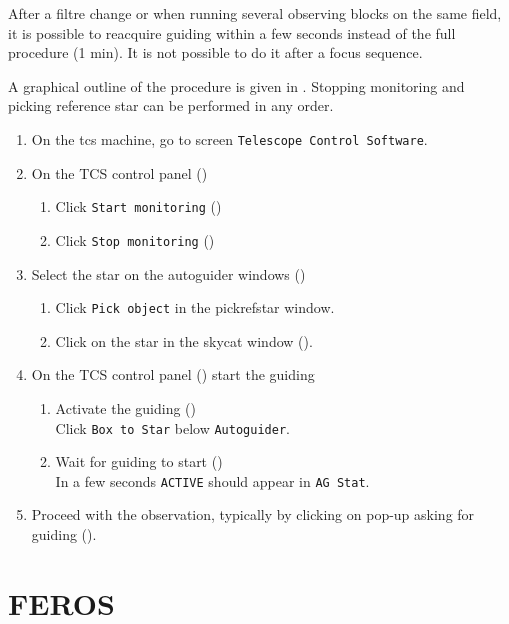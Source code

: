 \documentclass[11pt,fleqn,a4paper]{book}
\begin{document}
After a filtre change or when running several observing blocks on the same
field, it is possible to reacquire guiding within a few seconds instead of the
full procedure (1 min).  It is not possible to do it after a \gls{focus} sequence. 

A graphical outline of the procedure is given in .  Stopping monitoring and picking reference star can be performed in any order.
\label{proc:quickguide}
\begin{enumerate}
    \item On the \gls{tcs} machine, go to screen \texttt{Telescope Control Software}.
    \item On the \gls{TCS control panel} ()
    \begin{enumerate}
        \item Click \texttt{Start monitoring} ()
        \item Click \texttt{Stop monitoring}  ()
    \end{enumerate}
    \item Select the star on the autoguider windows () 
    \begin{enumerate}
        \item Click \texttt{Pick object} in the \gls{pickrefstar} window.
        \item Click on the star in the \gls{skycat} window ().
    \end{enumerate}
    \item On the \gls{TCS control panel} () start the guiding
    \begin{enumerate}
        \item Activate the guiding ()\\
              Click \texttt{Box to Star} below \texttt{Autoguider}.
        \item Wait for guiding to start ()\\
              In a few seconds \texttt{\-\-\-ACTIVE\-\-\-} should appear in \texttt{AG Stat}.
  \end{enumerate}
  \item Proceed with the observation, typically by clicking on pop-up asking for guiding ().
\end{enumerate}


\section{FEROS}
\end{document}
